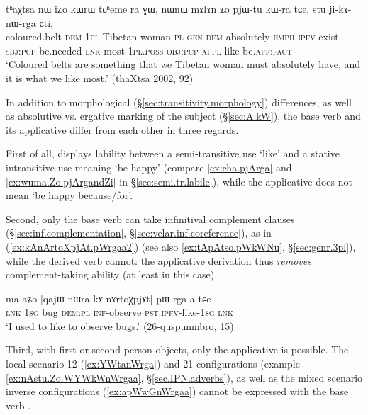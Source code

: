\begin{exe}
\ex \label{ex:stu.jikAnWrga.Cti}
\gll tʰaχtsa nɯ iʑo kɯrɯ tɕʰeme ra ɣɯ, nɯnɯ mɤlɤn ʑo pjɯ-tu kɯ-ra tɕe, stu ji-kɤ-nɯ-rga ɕti, \\
coloured.belt \textsc{dem} \textsc{1pl} Tibetan woman \textsc{pl} \textsc{gen} \textsc{dem} absolutely \textsc{emph} \textsc{ipfv}-exist \textsc{sbj}:\textsc{pcp}-be.needed \textsc{lnk} most \textsc{1pl}.\textsc{poss}-\textsc{obj}:\textsc{pcp}-\textsc{appl}-like be.\textsc{aff}:\textsc{fact} \\
\glt `Coloured belts are something that we Tibetan woman must absolutely have, and it is what we like most.' (thaXtsa 2002, 92)
\end{exe}
In addition to morphological (§\ref{sec:transitivity.morphology}) differences, as well as absolutive vs. ergative marking of the subject (§\ref{sec:A.kW}), the base verb  and its applicative  differ from each other in three regards. 

First of all,  displays lability between a semi-transitive use `like' and a stative intransitive use meaning `be happy' (compare \ref{ex:cha.pjArga} and \ref{ex:wuma.Zo.pjArgandZi} in §\ref{sec:semi.tr.labile}), while the applicative  does not mean `be happy because/for'.

Second, only the base verb  can take infinitival complement clauses (§\ref{sec:inf.complementation}, §\ref{sec:velar.inf.coreference}), as in (\ref{ex:kAnArtoXpjAt.pWrgaa2}) (see also \ref{ex:tApAtso.pWkWNu}, §\ref{sec:genr.3pl}), while the derived verb  cannot: the applicative derivation thus \textit{removes} complement-taking ability (at least in this case).

\begin{exe}
\ex \label{ex:kAnArtoXpjAt.pWrgaa2}
\gll ma aʑo [qajɯ nɯra kɤ-nɤrtoχpjɤt] pɯ-rga-a tɕe  \\
\textsc{lnk} \textsc{1sg} bug \textsc{dem}:\textsc{pl} \textsc{inf}-observe \textsc{pst}.\textsc{ipfv}-like-\textsc{1sg} \textsc{lnk} \\
\glt `I used to like to observe bugs.' (26-quspunmbro, 15)
\end{exe}

Third, with first or second person objects, only the applicative  is possible. The local scenario 1\fl{}2 (\ref{ex:YWtanWrga}) and 2\fl{}1 configurations (example \ref{ex:nAstu.Zo.WYWkWnWrgaa}, §\ref{sec.IPN.adverbs}), as well as the mixed scenario inverse configurations (\ref{ex:apWwGnWrgaa}) cannot be expressed with the base verb . 

